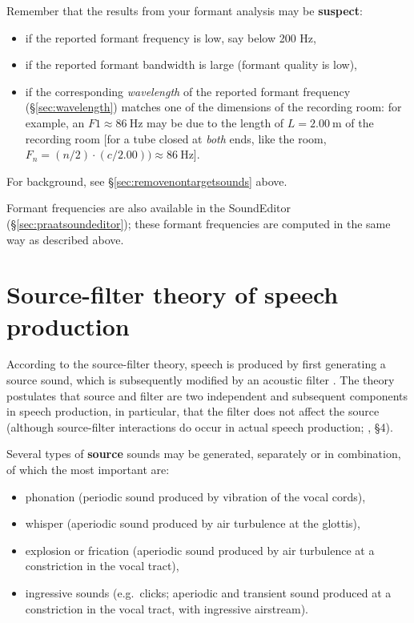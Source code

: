 \documentclass[
]{book}
\begin{document}
\label{box:formantanalysis}
Remember that the results from your formant analysis may be \textbf{suspect}:

\begin{itemize}
\item
  if the reported formant frequency is low, say below 200 Hz,
\item
  if the reported formant bandwidth is large (formant quality is low),
\item
  if the corresponding \emph{wavelength} of the reported formant frequency (§\ref{sec:wavelength}) matches one of the dimensions of the recording room: for example, an \(F1 \approx 86\ \textrm{Hz}\) may be due to the length of \(L=2.00\ \textrm{m}\) of the recording room {[}for a tube closed at \emph{both} ends, like the room, \(F_n=(n/2)\cdot(c/2.00)) \approx 86\ \textrm{Hz}\){]}.
\end{itemize}

For background, see §\ref{sec:removenontargetsounds} above.

Formant frequencies are also available in the SoundEditor (§\ref{sec:praatsoundeditor}); these formant frequencies are computed in the same way as described above.

\section{Source-filter theory of speech production}\label{sec:sourcefilter}

According to the source-filter theory, speech is produced by first generating a source sound, which is subsequently modified by an acoustic filter \citep{Fant_1970}. The theory postulates that source and filter are two independent and subsequent components in speech production, in particular, that the filter does not affect the source (although source-filter interactions do occur in actual speech production; \citet{Tokuda_2021}, §4).

Several types of \textbf{source} sounds may be generated, separately or in combination, of which the most important are:

\begin{itemize}
\item
  phonation (periodic sound produced by vibration of the vocal cords),
\item
  whisper (aperiodic sound produced by air turbulence at the glottis),
\item
  explosion or frication (aperiodic sound produced by air turbulence at a constriction in the vocal tract),
\item
  ingressive sounds (e.g.~clicks; aperiodic and transient sound produced at a constriction in the vocal tract, with ingressive airstream).
\end{itemize}
\end{document}
